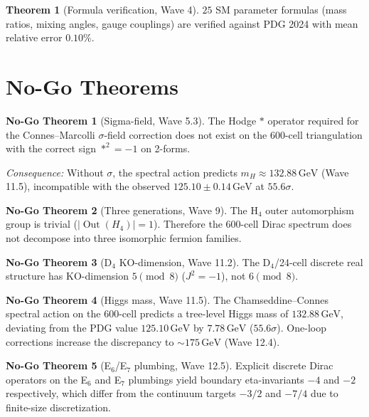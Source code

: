 \documentclass[11pt,a4paper]{article}
\theoremstyle{definition}
\newtheorem{theorem}{Theorem}[section]
\newtheorem{nogo}{No-Go Theorem}
\begin{document}
\begin{theorem}[Formula verification, Wave 4]\label{thm:formulas}
  $25$ SM parameter formulas (mass ratios, mixing angles, gauge couplings)
  are verified against PDG 2024 with mean relative error $0.10\%$.
\end{theorem}

\section{No-Go Theorems}\label{sec:nogo}

\begin{nogo}[Sigma-field, Wave 5.3]\label{nogo:sigma}
  The Hodge $*$ operator required for the Connes--Marcolli $\sigma$-field
correction does not exist on the 600-cell triangulation with the correct
sign $*^2 = -1$ on 2-forms.
\end{nogo}
\textit{Consequence:} Without $\sigma$, the spectral action predicts
$m_H \approx 132.88\,\text{GeV}$ (Wave 11.5), incompatible with the
observed $125.10 \pm 0.14\,\text{GeV}$ at $55.6\sigma$.

\begin{nogo}[Three generations, Wave 9]\label{nogo:3gen}
  The H$_4$ outer automorphism group is trivial ($|\operatorname{Out}(H_4)| = 1$).
  Therefore the 600-cell Dirac spectrum does not decompose into three
  isomorphic fermion families.
\end{nogo}

\begin{nogo}[D$_4$ KO-dimension, Wave 11.2]\label{nogo:d4}
  The D$_4$/24-cell discrete real structure has KO-dimension
  $5 \pmod 8$ ($J^2 = -1$), not $6 \pmod 8$.
\end{nogo}

\begin{nogo}[Higgs mass, Wave 11.5]\label{nogo:higgs}
  The Chamseddine--Connes spectral action on the 600-cell predicts a
tree-level Higgs mass of $132.88\,\text{GeV}$, deviating from the PDG
value $125.10\,\text{GeV}$ by $7.78\,\text{GeV}$ ($55.6\sigma$).
One-loop corrections increase the discrepancy to $\sim 175\,\text{GeV}$
(Wave 12.4).
\end{nogo}

\begin{nogo}[E$_6$/E$_7$ plumbing, Wave 12.5]\label{nogo:e6e7}
  Explicit discrete Dirac operators on the E$_6$ and E$_7$ plumbings yield
  boundary eta-invariants $-4$ and $-2$ respectively, which differ from the
  continuum targets $-3/2$ and $-7/4$ due to finite-size discretization.
\end{nogo}
\end{document}
